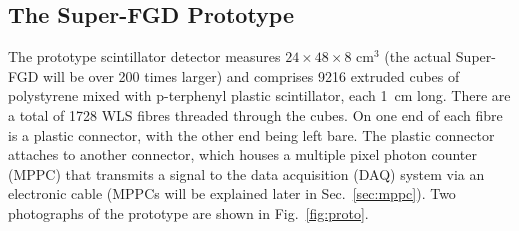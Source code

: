 \documentclass[aps,pra,12pt,notitlepage,tightenlines]{revtex4-1}
\begin{document}
\subsection{The Super-FGD Prototype}
The prototype scintillator detector measures $24\times48\times8$ cm$^3$ (the actual Super-FGD will be over 200 times larger) and comprises 9216 extruded cubes of polystyrene mixed with p-terphenyl plastic scintillator, each 1~cm long. There are a total of 1728 WLS fibres threaded through the cubes. On one end of each fibre is a plastic connector, with the other end being left bare. The plastic connector attaches to another connector, which houses a multiple pixel photon counter (MPPC) that transmits a signal to the data acquisition (DAQ) system via an electronic cable (MPPCs will be explained later in Sec.\ \ref{sec:mppc}). Two photographs of the prototype are shown in Fig.~\ref{fig:proto}.
\end{document}
